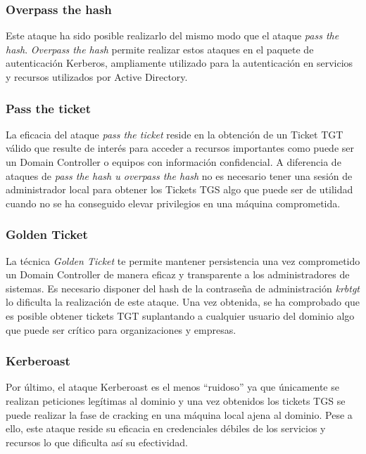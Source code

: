 \subsubsection{Overpass the hash}
Este ataque ha sido posible realizarlo del mismo modo que el ataque {\it pass the hash}. {\it Overpass the hash} permite realizar estos ataques en el paquete de autenticación Kerberos, ampliamente utilizado para la autenticación en servicios y recursos utilizados por Active Directory.
\subsubsection{Pass the ticket}
La eficacia del ataque {\it pass the ticket} reside en la obtención de un Ticket TGT válido que resulte de interés para acceder a recursos importantes como puede ser un Domain Controller o equipos con información confidencial. A diferencia de ataques de {\it pass the hash u overpass the hash} no es necesario tener una sesión de administrador local para obtener los Tickets TGS algo que puede ser de utilidad cuando no se ha conseguido elevar privilegios en una máquina comprometida.
\subsubsection{Golden Ticket}
La técnica {\it Golden Ticket} te permite mantener persistencia una vez comprometido un Domain Controller de manera eficaz y transparente a los administradores de sistemas. Es necesario disponer del hash de la contraseña de administración {\it krbtgt} lo dificulta la realización de este ataque. Una vez obtenida, se ha comprobado que es posible obtener tickets TGT suplantando a cualquier usuario del dominio algo que puede ser crítico para organizaciones y empresas. 
\subsubsection{Kerberoast}
Por último, el ataque Kerberoast es el menos ``ruidoso'' ya que únicamente se realizan peticiones legítimas al dominio y una vez obtenidos los tickets TGS se puede realizar la fase de cracking en una máquina local ajena al dominio. Pese a ello, este ataque reside su eficacia en credenciales débiles de los servicios y recursos lo que dificulta así su efectividad. 
